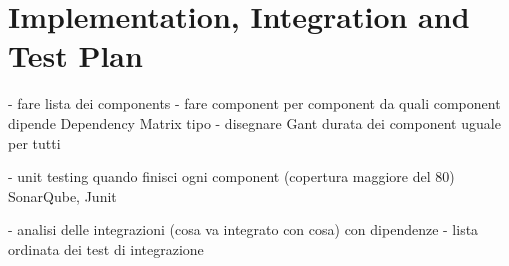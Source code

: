 
 \chapter{Implementation, Integration and Test Plan}
	- fare lista dei components
	- fare component per component da quali component dipende Dependency Matrix tipo
	- disegnare Gant durata dei component uguale per tutti

	- unit testing quando finisci ogni component (copertura maggiore del 80) SonarQube, Junit

	- analisi delle integrazioni (cosa va integrato con cosa) con dipendenze
	- lista ordinata dei test di integrazione
\thispagestyle{fancy}
 
